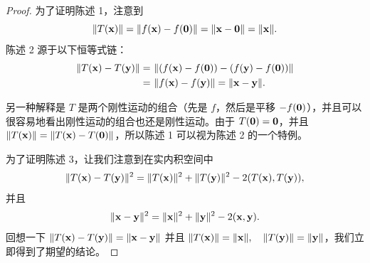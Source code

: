 \begin{proof}为了证明陈述 1，注意到
$$\|T(\mathbf{x})\| = \|f(\mathbf{x}) - f(\mathbf{0})\| = \|\mathbf{x} - \mathbf{0}\| = \|\mathbf{x}\|.$$
陈述 2 源于以下恒等式链：
\begin{equation} \notag
\begin{split}
\|T(\mathbf{x}) - T(\mathbf{y})\|
=&\   \|(f(\mathbf{x}) - f(\mathbf{0})) - (f(\mathbf{y}) - f(\mathbf{0}))\| \\
=&\   \|f(\mathbf{x}) - f(\mathbf{y})\| = \|\mathbf{x} - \mathbf{y}\|.
\end{split}
\end{equation}

另一种解释是 $T$ 是两个刚性运动的组合（先是 $f$，然后是平移 $-f(\mathbf{0})$），并且可以很容易地看出刚性运动的组合也还是刚性运动。由于 $T(\mathbf{0}) = \mathbf{0}$，并且 $\|T(\mathbf{x})\| = \|T(\mathbf{x}) - T(\mathbf{0})\|$，所以陈述 1 可以视为陈述 2 的一个特例。

为了证明陈述 3，让我们注意到在实内积空间中
$$\|T(\mathbf{x}) - T(\mathbf{y})\|^2 = \|T(\mathbf{x})\|^2 + \|T(\mathbf{y})\|^2 - 2(T(\mathbf{x}), T(\mathbf{y})),$$
并且
$$\|\mathbf{x} - \mathbf{y}\|^2 = \|\mathbf{x}\|^2 + \|\mathbf{y}\|^2 - 2(\mathbf{x}, \mathbf{y}).$$
回想一下 $\|T(\mathbf{x}) - T(\mathbf{y})\| = \|\mathbf{x} - \mathbf{y}\|$ 并且 $\|T(\mathbf{x})\| = \|\mathbf{x}\|, \quad \|T(\mathbf{y})\| = \|\mathbf{y}\|$，我们立即得到了期望的结论。\end{proof}

